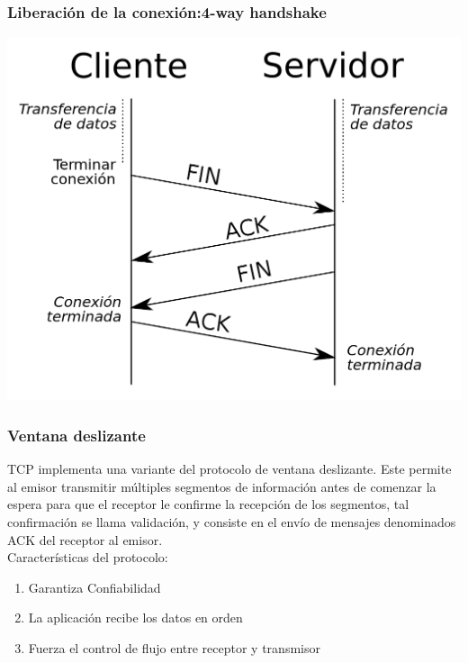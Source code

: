 \documentclass{beamer}
\begin{document}
\begin{frame}
\frametitle{Liberación de la conexión:4-way handshake}
\includegraphics[scale=0.2]{4}\\
\end{frame}

\begin{frame}
	\frametitle{Ventana deslizante}
	TCP implementa una variante del protocolo de ventana deslizante. Este permite al emisor transmitir múltiples segmentos de información antes de comenzar la espera para que el receptor le confirme la recepción de los segmentos, tal confirmación se llama validación, y consiste en el envío de mensajes denominados ACK del receptor al emisor. \\
	Características del protocolo:\\
	\begin{enumerate}
		\item Garantiza Confiabilidad
		\item La aplicación recibe los datos en orden
		\item Fuerza el control de flujo entre receptor y transmisor
	\end{enumerate}
\end{frame}
\end{document}
